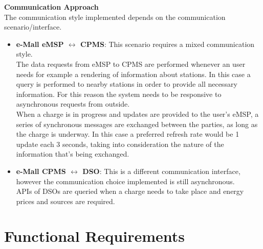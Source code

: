 \documentclass[12pt]{report}
\begin{document}
\bigskip

\textbf{Communication Approach}\\
The communication style implemented depends on the communication scenario/interface.\\
\begin{itemize}
    \item\textbf{e-Mall eMSP $\longleftrightarrow$ CPMS}: This scenario requires a mixed communication style.\\The data requests from eMSP to CPMS are performed whenever an user needs for example a rendering of information about stations. In this case a query is performed to nearby stations in order to provide all necessary information. For this reason the system needs to be responsive to asynchronous requests from outside.\\
    When a charge is in progress and updates are provided to the user's eMSP, a series of synchronous messages are exchanged between the parties, as long as the charge is underway. In this case a preferred refresh rate would be 1 update each 3 seconds, taking into consideration the nature of the information that's being exchanged.
    \item\textbf{e-Mall CPMS $\longleftrightarrow$ DSO}: This is a different communication interface, however the communication choice implemented is still asynchronous.\\
    APIs of DSOs are queried when a charge needs to take place and energy prices and sources are required. 
\end{itemize}
\newpage

\section{Functional Requirements}
\end{document}
